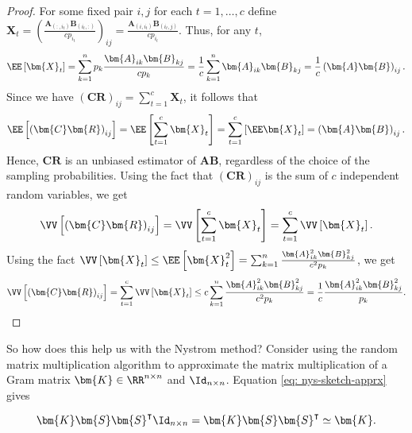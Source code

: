 \begin{proof}
    For some fixed pair $i,j$ for each $t = 1 , \ldots , c$ define $\bm{X}_t = \left( \frac{\bm{A}_{(:,i_t)} \bm{B}_{(i_t,:)}}{c p_{i_t}} \right)_{ij} = \frac{\bm{A}_{(i,i_t)} \bm{B}_{(i_t,j)}}{c p_{i_t}}$. Thus, for any $t$,
    \begin{align*}
        \EE \left[ \bm{X}_t \right] = \sum_{k=1}^{n} p_k \frac{\bm{A}_{ik} \bm{B}_{kj}}{cp_k} = \frac{1}{c} \sum_{k=1}^{n} \bm{A}_{ik} \bm{B}_{kj} = \frac{1}{c} \left( \bm{A} \bm{B} \right)_{ij}.
    \end{align*}
    Since we have $\left( \bm{C} \bm{R} \right)_{ij} = \sum_{t=1}^{c} \bm{X}_t$, it follows that
    \begin{align*}
        \EE \left[ \left( \bm{C} \bm{R} \right)_{ij} \right] = \EE \left[ \sum_{t=1}^{c} \bm{X}_t \right] = \sum_{t=1}^{c} \left[ \EE \bm{X}_t \right] = \left( \bm{A} \bm{B} \right)_{ij}.
    \end{align*}
    Hence, $\bm{C} \bm{R}$ is an unbiased estimator of $\bm{A}\bm{B}$, regardless of the choice of the sampling probabilities. Using the fact that $\left( \bm{C} \bm{R} \right)_{ij}$ is the sum of $c$ independent random variables, we get
    \begin{equation*}
        \VV \left[ \left( \bm{C} \bm{R} \right)_{ij} \right] = \VV \left[ \sum_{t=1}^{c} \bm{X}_t \right] = \sum_{t=1}^{c} \VV \left[ \bm{X}_t \right].
    \end{equation*}
    Using the fact $\VV \left[ \bm{X}_t \right] \leq \EE \left[ \bm{X}_t^2 \right] = \sum_{k=1}^n \frac{\bm{A}_{ik}^2 \bm{B}_{kj}^2}{c^2 p_k}$, we get
    \begin{equation*}
        \VV \left[ \left( \bm{C} \bm{R} \right)_{ij} \right] = \sum_{t=1}^{c} \VV \left[ \bm{X}_t \right] \leq c \sum_{k=1}^n \frac{\bm{A}_{ik}^2 \bm{B}_{kj}^2}{c^2 p_k} = \frac{1}{c} \frac{\bm{A}_{ik}^2 \bm{B}_{kj}^2}{p_k}.
    \end{equation*}
\end{proof}

So how does this help us with the Nystrom method? Consider using the random matrix multiplication algorithm to approximate the matrix multiplication of a Gram matrix $\bm{K} \in \RR^{n \times n}$ and $\Id_{n \times n}$. Equation \ref{eq: nys-sketch-apprx} gives

\begin{equation*}
    \bm{K} \bm{S} \bm{S}^{\intercal} \Id_{n \times n} = \bm{K} \bm{S} \bm{S}^{\intercal} \simeq \bm{K}.
\end{equation*}

